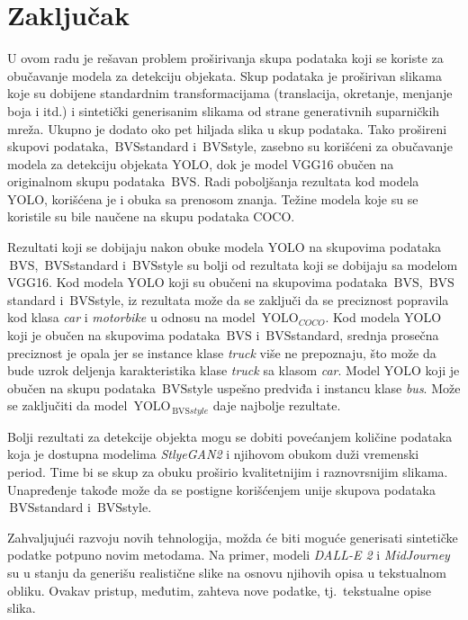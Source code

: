 \documentclass[12pt,oneside]{memoir}
\newcommand{\yolo}{\ensuremath{\,\textrm{YOLO}}}
\newcommand{\bvs}{\ensuremath{\,\textrm{BVS}}}
\begin{document}
\chapter{Zaključak}
\label{section6}
U ovom radu je rešavan problem proširivanja skupa podataka koji se koriste za obučavanje modela za detekciju objekata. Skup podataka je proširivan slikama koje su dobijene standardnim transformacijama (translacija, okretanje, menjanje boja i itd.) i sintetički generisanim slikama od strane generativnih suparničkih mreža. Ukupno je dodato oko pet hiljada slika u skup podataka. Tako prošireni skupovi podataka, \bvs{standard} i \bvs{style}, zasebno su korišćeni za obučavanje modela za detekciju objekata YOLO, dok je model VGG16 obučen na originalnom skupu podataka \bvs.
Radi poboljšanja rezultata kod modela YOLO, korišćena je i obuka sa prenosom znanja. Težine modela koje su se koristile su bile naučene na skupu podataka COCO.

Rezultati koji se dobijaju nakon obuke modela YOLO na skupovima podataka \bvs, \bvs{standard} i \bvs{style} su bolji od rezultata koji se dobijaju sa modelom VGG16. Kod modela YOLO koji su obučeni na skupovima podataka \bvs, \bvs{standard} i \bvs{style}, iz rezultata može da se zaključi da se preciznost popravila kod klasa \textit{car} i \textit{motorbike} u odnosu na model $\yolo_{COCO}$. Kod modela YOLO koji je obučen na skupovima podataka \bvs{} i \bvs{standard}, srednja prosečna preciznost je opala jer se instance klase \textit{truck} više ne prepoznaju, što može da bude uzrok deljenja karakteristika klase \textit{truck} sa klasom \textit{car}. Model YOLO koji je obučen na skupu podataka \bvs{style} uspešno predviđa i instancu klase \textit{bus}. Može se zaključiti da model $\yolo_{\bvs{style}}$ daje najbolje rezultate.

Bolji rezultati za detekcije objekta mogu se dobiti povećanjem količine podataka koja je dostupna modelima \textit{StlyeGAN2} i njihovom obukom duži vremenski period. Time bi se skup za obuku proširio kvalitetnijim i raznovrsnijim slikama.
Unapređenje takođe može da se postigne korišćenjem unije skupova podataka \bvs{standard} i \bvs{style}.

Zahvaljujući razvoju novih tehnologija, možda će biti moguće generisati sintetičke podatke potpuno novim metodama. Na primer, modeli \textit{DALL-E 2} \cite{reddy2021dall} i \textit{MidJourney} \cite{midjourney2022} su u stanju da generišu realistične slike na osnovu njihovih opisa u tekstualnom obliku. Ovakav pristup, međutim, zahteva nove podatke, tj.~tekstualne opise slika.
\end{document}
